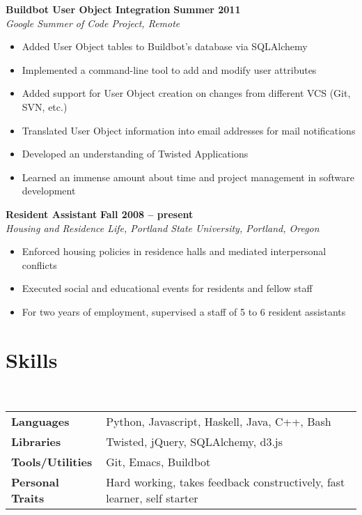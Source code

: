 \documentclass[margin,line]{resume}
\begin{document}
\begin{resume}
    \textbf{Buildbot User Object Integration} \hfill \textbf{Summer 2011} \vspace{2mm}\\\vspace{1mm}%
    \textsl{Google Summer of Code Project, Remote}
    \begin{itemize}
        \item Added User Object tables to Buildbot's database via SQLAlchemy
        \item Implemented a command-line tool to add and modify user attributes
        \item Added support for User Object creation on changes from different VCS (Git, SVN, etc.)
        \item Translated User Object information into email addresses for mail notifications
        \item Developed an understanding of Twisted Applications
        \item Learned an immense amount about time and project management in software development
    \end{itemize}

    \textbf{Resident Assistant} \hfill \textbf{Fall 2008 -- present} \vspace{2mm}\\\vspace{1mm}%
    \textsl{Housing and Residence Life, Portland State University, Portland, Oregon}
    \begin{itemize}
        \item Enforced housing policies in residence halls and mediated interpersonal conflicts
        \item Executed social and educational events for residents and fellow staff
        \item For two years of employment, supervised a staff of 5 to 6 resident assistants
    \end{itemize}

    \section{\mysidestyle Skills}

    \vspace{1mm}\\
    \begin{tabular}{@{}l|l}
        \textbf{Languages}       & Python, Javascript, Haskell, Java, C++, Bash\\[1mm]
        \textbf{Libraries}       & Twisted, jQuery, SQLAlchemy, d3.js\\[1mm]
        \textbf{Tools/Utilities} & Git, Emacs, Buildbot\\[1mm]
        \textbf{Personal Traits} & Hard working, takes feedback constructively, fast learner, self starter
    \end{tabular}


\end{resume}
\end{document}
